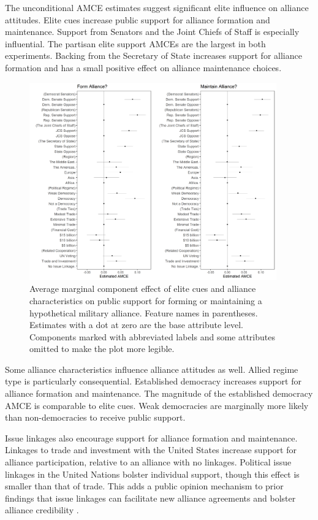 \documentclass[12pt]{article}
\begin{document}
The unconditional AMCE estimates suggest significant elite influence on alliance attitudes. 
Elite cues increase public support for alliance formation and maintenance. 
Support from Senators and the Joint Chiefs of Staff is especially influential.
The partisan elite support AMCEs are the largest in both experiments.
Backing from the Secretary of State increases support for alliance formation and has a small positive effect on alliance maintenance choices. 


\begin{figure}
	\centering
		\includegraphics[width=0.95\textwidth]{../figures/joint-amce-plots.png}
	\caption{Average marginal component effect of elite cues and alliance characteristics on public support for forming or maintaining a hypothetical military alliance. Feature names in parentheses. Estimates with a dot at zero are the base attribute level. Components marked with abbreviated labels and some attributes omitted to make the plot more legible.}
	\label{fig:joint-plot}
\end{figure}


Some alliance characteristics influence alliance attitudes as well. 
Allied regime type is particularly consequential. 
Established democracy increases support for alliance formation and maintenance.
The magnitude of the established democracy AMCE is comparable to elite cues.   
Weak democracies are marginally more likely than non-democracies to receive public support.


Issue linkages also encourage support for alliance formation and maintenance. 
Linkages to trade and investment with the United States increase support for alliance participation, relative to an alliance with no linkages. 
Political issue linkages in the United Nations bolster individual support, though this effect is smaller than that of trade. 
This adds a public opinion mechanism to prior findings that issue linkages can facilitate new alliance agreements \citep{Poast2012} and bolster alliance credibility \citep{Poast2013}. 
\end{document}
